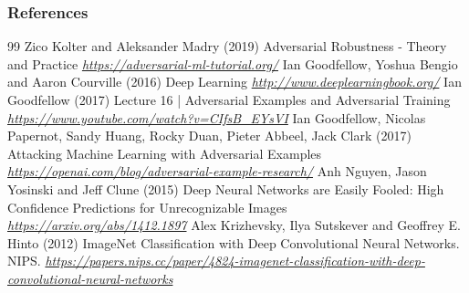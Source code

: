 \documentclass[11pt,compress,t,notes=noshow, xcolor=table]{beamer}
\begin{document}

\begin{vbframe}
\frametitle{References}
\footnotesize{
\begin{thebibliography}{99}
 Zico Kolter and Aleksander Madry (2019)
\newblock Adversarial Robustness - Theory and Practice
\newblock \emph{\url{https://adversarial-ml-tutorial.org/}}
 Ian Goodfellow, Yoshua Bengio and Aaron Courville (2016)
\newblock Deep Learning
\newblock \emph{\url{http://www.deeplearningbook.org/}}
 Ian Goodfellow (2017)
\newblock Lecture 16 | Adversarial Examples and Adversarial Training
\newblock \emph{\url{https://www.youtube.com/watch?v=CIfsB_EYsVI}}
  Ian Goodfellow, Nicolas Papernot, Sandy Huang, Rocky Duan, Pieter Abbeel, Jack Clark (2017)
\newblock Attacking Machine Learning with Adversarial Examples
\newblock \emph{\url{https://openai.com/blog/adversarial-example-research/}}
 Anh Nguyen, Jason Yosinski and Jeff Clune (2015)
\newblock Deep Neural Networks are Easily Fooled: High Confidence Predictions for Unrecognizable Images
\newblock \emph{\url{https://arxiv.org/abs/1412.1897}}
 Alex Krizhevsky, Ilya Sutskever and Geoffrey E. Hinto (2012)
\newblock ImageNet Classification with Deep Convolutional Neural Networks. NIPS. 
\newblock \emph{\url{https://papers.nips.cc/paper/4824-imagenet-classification-with-deep-convolutional-neural-networks}}

\end{thebibliography}}
\end{vbframe}
\end{document}
